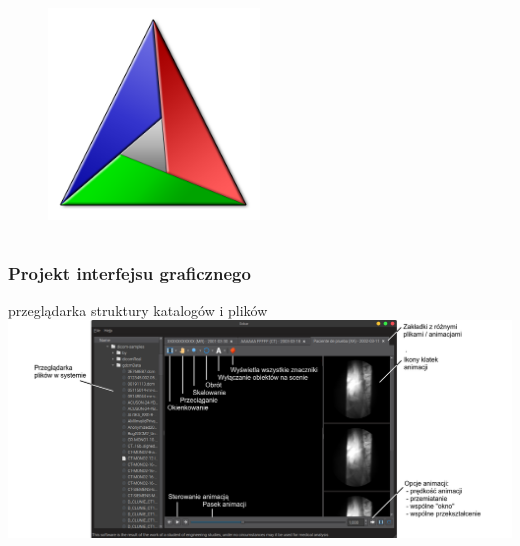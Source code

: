\documentclass[aspectratio=169]{beamer}
\begin{document}
\begin{frame}[t]
\begin{columns}[c]
        \begin{figure}
            \includegraphics[width=0.5\textwidth]{img/logo-cmake.png}
        \end{figure}

    \end{columns}
\end{frame}

\begin{frame}
    \frametitle{Projekt interfejsu graficznego}
    \centering
    przeglądarka struktury katalogów i plików
    \includegraphics[height=0.8\textheight]{img/sokar-gui-004.png}
\end{frame}
\end{document}
